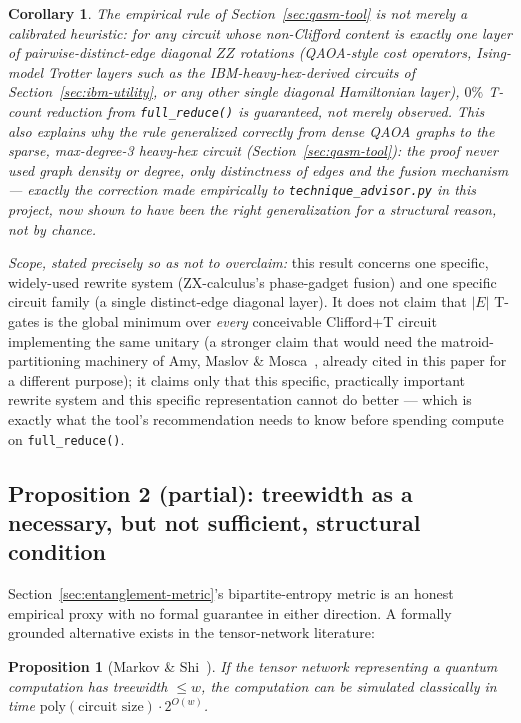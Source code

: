 \documentclass[9pt,twocolumn]{extarticle}
\newtheorem{proposition}{Proposition}
\newtheorem{corollary}{Corollary}
\begin{document}
\begin{corollary}
The empirical rule of Section~\ref{sec:qasm-tool} is not merely a
calibrated heuristic: for any circuit whose non-Clifford content is
exactly one layer of pairwise-distinct-edge diagonal $ZZ$ rotations
(QAOA-style cost operators, Ising-model Trotter layers such as the
IBM-heavy-hex-derived circuits of Section~\ref{sec:ibm-utility}, or any
other single diagonal Hamiltonian layer), $0\%$ T-count reduction from
\texttt{full\_reduce()} is \emph{guaranteed}, not merely observed. This
also explains why the rule generalized correctly from dense QAOA graphs to
the sparse, max-degree-3 heavy-hex circuit (Section~\ref{sec:qasm-tool}):
the proof never used graph density or degree, only distinctness of edges
and the fusion mechanism --- exactly the correction made empirically to
\texttt{technique\_advisor.py} in this project, now shown to have been
the right generalization for a structural reason, not by chance.
\end{corollary}

\emph{Scope, stated precisely so as not to overclaim:} this result concerns
one specific, widely-used rewrite system (ZX-calculus's phase-gadget
fusion) and one specific circuit family (a single distinct-edge diagonal
layer). It does not claim that $|E|$ T-gates is the global minimum over
\emph{every} conceivable Clifford+T circuit implementing the same unitary
(a stronger claim that would need the matroid-partitioning machinery of
Amy, Maslov \& Mosca~\cite{amy2014}, already cited in this paper for a
different purpose); it claims only that this specific, practically
important rewrite system and this specific representation cannot do
better --- which is exactly what the tool's recommendation needs to know
before spending compute on \texttt{full\_reduce()}.

\subsection{Proposition 2 (partial): treewidth as a necessary, but not sufficient, structural condition}
\label{sec:prop2}
Section~\ref{sec:entanglement-metric}'s bipartite-entropy metric is an
honest empirical proxy with no formal guarantee in either direction. A
formally grounded alternative exists in the tensor-network literature:

\begin{proposition}[Markov \& Shi~\cite{markovshi2008}]
If the tensor network representing a quantum computation has treewidth
$\leq w$, the computation can be simulated classically in time
$\mathrm{poly}(\text{circuit size}) \cdot 2^{O(w)}$.
\end{proposition}
\end{document}
